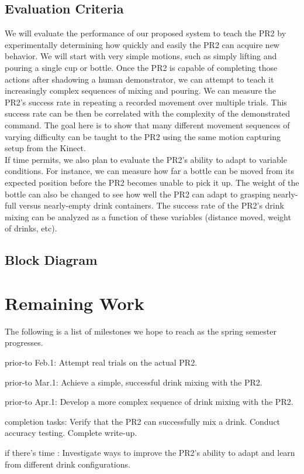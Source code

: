 \documentclass{sig-alternate}
\begin{document}
\subsection{Evaluation Criteria}
\label{subsec:eval_criteria}
We will evaluate the performance of our proposed system to teach the PR2 by experimentally determining how quickly and easily the PR2
can acquire new behavior. We will start with very simple motions, such as simply lifting and pouring a single cup or bottle. Once the PR2 is capable of completing those actions after shadowing a human demonstrator, we can attempt to teach it increasingly complex sequences of mixing and pouring. We can measure the PR2's success rate in repeating a recorded movement over multiple trials. This success rate can be then be correlated with the complexity of the demonstrated command. The goal here is to show that many different movement sequences of varying difficulty can be taught to the PR2 using the same motion capturing setup from the Kinect.\\
If time permits, we also plan to evaluate the PR2's ability to adapt to variable conditions. For instance, we can measure how far a bottle can be moved from its expected position before the PR2 becomes unable to pick it up. The weight of the bottle can also be changed to see how well the PR2 can adapt to grasping nearly-full versus nearly-empty drink containers. The success rate of the PR2's drink mixing can be analyzed as a function of these variables (distance moved, weight of drinks, etc).
\subsection{Block Diagram}
\label{subsec:block_diagram}

\section{Remaining Work}
\label{sec:remaining_work}
The following is a list of milestones we hope to reach as the spring semester progresses.

\begin{itemize*}
	\item {\sc prior-to Feb.1}: Attempt real trials on the actual PR2.\vspace{3pt}
	\item {\sc prior-to Mar.1}: Achieve a simple, successful drink mixing with the PR2.\vspace{3pt}
	\item {\sc prior-to Apr.1}: Develop a more complex sequence of drink mixing with the PR2.\vspace{3pt}
	\item {\sc completion tasks}: Verify that the PR2 can successfully mix a drink. Conduct accuracy testing. Complete write-up.\vspace{3pt}
	\item {\sc if there's time} : Investigate ways to improve the PR2's ability to adapt and learn from different drink configurations.
\end{itemize*}

\end{document}
